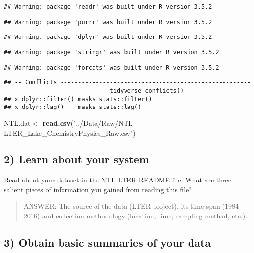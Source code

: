 \documentclass[]{article}
\newenvironment{Shaded}{\begin{snugshade}}{\end{snugshade}}
\newcommand{\KeywordTok}[1]{\textcolor[rgb]{0.13,0.29,0.53}{\textbf{#1}}}
\newcommand{\StringTok}[1]{\textcolor[rgb]{0.31,0.60,0.02}{#1}}
\newcommand{\NormalTok}[1]{#1}
\begin{document}
\begin{verbatim}
## Warning: package 'readr' was built under R version 3.5.2
\end{verbatim}

\begin{verbatim}
## Warning: package 'purrr' was built under R version 3.5.2
\end{verbatim}

\begin{verbatim}
## Warning: package 'dplyr' was built under R version 3.5.2
\end{verbatim}

\begin{verbatim}
## Warning: package 'stringr' was built under R version 3.5.2
\end{verbatim}

\begin{verbatim}
## Warning: package 'forcats' was built under R version 3.5.2
\end{verbatim}

\begin{verbatim}
## -- Conflicts ----------------------------------------------------------------------------------- tidyverse_conflicts() --
## x dplyr::filter() masks stats::filter()
## x dplyr::lag()    masks stats::lag()
\end{verbatim}

\begin{Shaded}
\begin{Highlighting}[]
\NormalTok{NTL.dat <-}\StringTok{ }\KeywordTok{read.csv}\NormalTok{(}\StringTok{"../Data/Raw/NTL-LTER_Lake_ChemistryPhysics_Raw.csv"}\NormalTok{)}
\end{Highlighting}
\end{Shaded}

\subsection{2) Learn about your system}\label{learn-about-your-system}

Read about your dataset in the NTL-LTER README file. What are three
salient pieces of information you gained from reading this file?

\begin{quote}
ANSWER: The source of the data (LTER project), its time span (1984-2016)
and collection methodology (location, time, sampling method, etc.).
\end{quote}

\subsection{3) Obtain basic summaries of your
data}\label{obtain-basic-summaries-of-your-data}
\end{document}
